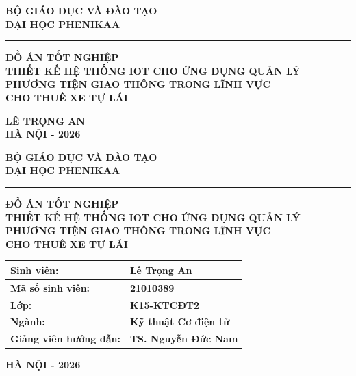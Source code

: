 \documentclass[13pt,a4paper]{extarticle}
\author{}
\date{}
\newcommand{\thesislongtableorignewline}{}
\let\thesislongtableorignewline\\
\renewcommand{\\}{\thesislongtableorignewline\hline}%
\let\\\thesislongtableorignewline
\begin{document}

\thispagestyle{empty}
\begin{center}
\textbf{BỘ GIÁO DỤC VÀ ĐÀO TẠO}\\
\textbf{ĐẠI HỌC PHENIKAA}\\[0.25cm]
\rule{0.55\linewidth}{0.6pt}
\vspace*{2.2cm}

{\Large\textbf{ĐỒ ÁN TỐT NGHIỆP}}\\[0.9cm]
{\Large\textbf{THIẾT KẾ HỆ THỐNG IOT CHO ỨNG DỤNG QUẢN LÝ}}\\
{\Large\textbf{PHƯƠNG TIỆN GIAO THÔNG TRONG LĨNH VỰC}}\\
{\Large\textbf{CHO THUÊ XE TỰ LÁI}}
\vfill

\textbf{LÊ TRỌNG AN}\\[0.4cm]
\textbf{HÀ NỘI - 2026}
\end{center}
\clearpage

\thispagestyle{empty}
\begin{center}
\textbf{BỘ GIÁO DỤC VÀ ĐÀO TẠO}\\
\textbf{ĐẠI HỌC PHENIKAA}\\[0.25cm]
\rule{0.55\linewidth}{0.6pt}
\vspace*{1.8cm}

{\Large\textbf{ĐỒ ÁN TỐT NGHIỆP}}\\[0.8cm]
{\large\textbf{THIẾT KẾ HỆ THỐNG IOT CHO ỨNG DỤNG QUẢN LÝ}}\\
{\large\textbf{PHƯƠNG TIỆN GIAO THÔNG TRONG LĨNH VỰC}}\\
{\large\textbf{CHO THUÊ XE TỰ LÁI}}
\vfill

\begin{tabular}{|l|l|}
\hline
\textbf{Sinh viên:} & \textbf{Lê Trọng An} \\
\hline
\textbf{Mã số sinh viên:} & \textbf{21010389} \\
\hline
\textbf{Lớp:} & \textbf{K15-KTCĐT2} \\
\hline
\textbf{Ngành:} & \textbf{Kỹ thuật Cơ điện tử} \\
\hline
\textbf{Giảng viên hướng dẫn:} & \textbf{TS. Nguyễn Đức Nam} \\
\hline
\end{tabular}

\vspace{1.0cm}
\textbf{HÀ NỘI - 2026}
\end{center}
\clearpage
\end{document}
